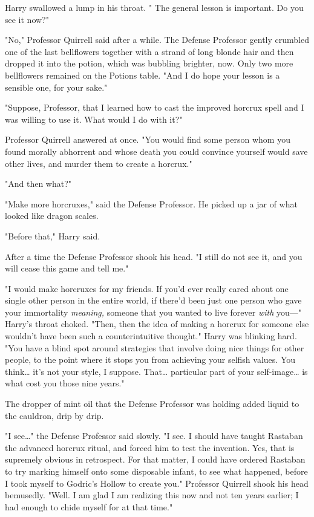 Harry swallowed a lump in his throat. " The general lesson is important. Do you 
see it now?"

"No," Professor Quirrell said after a while. The Defense Professor gently 
crumbled one of the last bellflowers together with a strand of long blonde hair 
and then dropped it into the potion, which was bubbling brighter, now. Only two 
more bellflowers remained on the Potions table. "And I do hope your lesson is a 
sensible one, for your sake."

"Suppose, Professor, that I learned how to cast the improved horcrux spell and 
I was willing to use it. What would I do with it?"

Professor Quirrell answered at once. "You would find some person whom you found 
morally abhorrent and whose death you could convince yourself would save other 
lives, and murder them to create a horcrux."

"And then what?"

"Make more horcruxes," said the Defense Professor. He picked up a jar of what 
looked like dragon scales.

"Before that," Harry said.

After a time the Defense Professor shook his head. "I still do not see it, and 
you will cease this game and tell me."

"I would make horcruxes for my friends. If you'd ever really cared about one 
single other person in the entire world, if there'd been just one person who 
gave your immortality \emph{meaning,} someone that you wanted to live forever 
\emph{with} you---" Harry's throat choked. "Then, then the idea of making a 
horcrux for someone else wouldn't have been such a counterintuitive thought." 
Harry was blinking hard. "You have a blind spot around strategies that involve 
doing nice things for other people, to the point where it stops you from 
achieving your selfish values. You think{\ldots} it's not your style, I 
suppose. That{\ldots} particular part of your self-image{\ldots} is what cost 
you those nine years."

The dropper of mint oil that the Defense Professor was holding added liquid to 
the cauldron, drip by drip.

"I see{\ldots}" the Defense Professor said slowly. "I see. I should have taught 
Rastaban the advanced horcrux ritual, and forced him to test the invention. 
Yes, that is supremely obvious in retrospect. For that matter, I could have 
ordered Rastaban to try marking himself onto some disposable infant, to see 
what happened, before I took myself to Godric's Hollow to create you." 
Professor Quirrell shook his head bemusedly. "Well. I am glad I am realizing 
this now and not ten years earlier; I had enough to chide myself for at that 
time."

